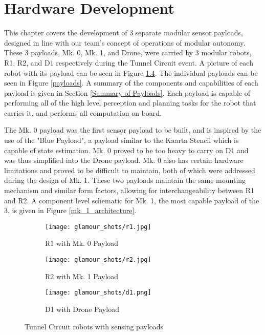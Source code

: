 \chapter{Hardware Development}

This chapter covers the development of 3 separate modular sensor payloads, designed in line with our team's concept of operations of modular autonomy. These 3 payloads, Mk. 0, Mk. 1, and Drone, were carried by 3 modular robots, R1, R2, and D1 respectively during the Tunnel Circuit event. A picture of each robot with its payload can be seen in Figure \ref{glamour_shots}. The individual payloads can be seen in Figure \ref{payloads}. A summary of the components and capabilities of each payload is given in Section \ref{Summary of Payloads}. Each payload is capable of performing all of the high level perception and planning tasks for the robot that carries it, and performs all computation on board.

The Mk. 0 payload was the first sensor payload to be built, and is inspired by the use of the "Blue Payload", a payload similar to the Kaarta Stencil \cite{kaarta} which is capable of state estimation. Mk. 0 proved to be too heavy to carry on D1 and was thus simplified into the Drone payload. Mk. 0 also has certain hardware limitations and proved to be difficult to maintain, both of which were addressed during the design of Mk. 1. These two payloads maintain the same mounting mechanism and similar form factors, allowing for interchangeability between R1 and R2. A component level schematic for Mk. 1, the most capable payload of the 3, is given in Figure \ref{mk_1_architecture}.

\begin{figure}
	\centering
	\begin{subfigure}{0.32\textwidth}
		\texttt{[image: glamour\_shots/r1.jpg]}
		\caption{R1 with Mk. 0 Payload}
		\label{r1_glamour}
	\end{subfigure}		
	\hfill
	\begin{subfigure}{0.32\textwidth}
		\texttt{[image: glamour\_shots/r2.jpg]}
		\caption{R2 with Mk. 1 Payload}
		\label{r2_glamour}		
	\end{subfigure}
	\hfill
	\begin{subfigure}{0.32\textwidth}
		\texttt{[image: glamour\_shots/d1.png]}
		\caption{D1 with Drone Payload}
		\label{d1_glamour}
	\end{subfigure}	
	\caption{Tunnel Circuit robots with sensing payloads}
	\label{glamour_shots}
\end{figure}

